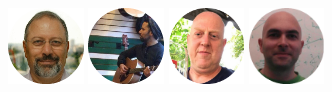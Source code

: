 \begin{frame}
\titlepage
\begin{center}
    \includegraphics[height=2cm]{reuven.png}
    \includegraphics[height=2cm]{ariel.png}
    \includegraphics[height=2cm]{dror.png}
    \includegraphics[height=2cm]{roy.png}
\end{center}

\end{frame}
